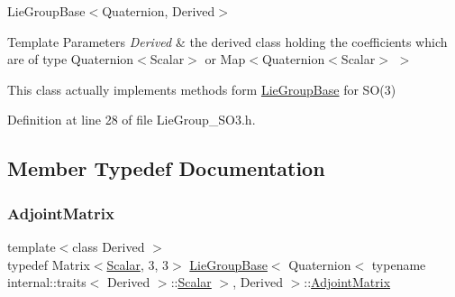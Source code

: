 Lie\+Group\+Base$<$\+Quaternion, Derived$>$


\begin{DoxyTemplParams}{Template Parameters}
{\em Derived} & the derived class holding the coefficients which are of type Quaternion$<$\+Scalar$>$ or Map$<$Quaternion$<$\+Scalar$>$ $>$\\
\hline
\end{DoxyTemplParams}
This class actually implements methods form \hyperlink{class_lie_group_base}{Lie\+Group\+Base} for S\+O(3) 

Definition at line 28 of file Lie\+Group\+\_\+\+S\+O3.\+h.



\subsection{Member Typedef Documentation}
\hypertarget{class_lie_group_base_3_01_quaternion_3_01typename_01internal_1_1traits_3_01_derived_01_4_1_1_scalar_01_4_00_01_derived_01_4_a78de97b1de2faa5ee198be16e6b61931}{}\label{class_lie_group_base_3_01_quaternion_3_01typename_01internal_1_1traits_3_01_derived_01_4_1_1_scalar_01_4_00_01_derived_01_4_a78de97b1de2faa5ee198be16e6b61931} 
\subsubsection{\texorpdfstring{Adjoint\+Matrix}{AdjointMatrix}}
{\footnotesize\ttfamily template$<$class Derived $>$ \\
typedef Matrix$<$\hyperlink{class_lie_group_base_3_01_quaternion_3_01typename_01internal_1_1traits_3_01_derived_01_4_1_1_scalar_01_4_00_01_derived_01_4_afadeceb3b98e52deecc572e71efb82a8}{Scalar}, 3, 3$>$ \hyperlink{class_lie_group_base}{Lie\+Group\+Base}$<$ Quaternion$<$ typename internal\+::traits$<$ Derived $>$\+::\hyperlink{class_lie_group_base_3_01_quaternion_3_01typename_01internal_1_1traits_3_01_derived_01_4_1_1_scalar_01_4_00_01_derived_01_4_afadeceb3b98e52deecc572e71efb82a8}{Scalar} $>$, Derived $>$\+::\hyperlink{class_lie_group_base_3_01_quaternion_3_01typename_01internal_1_1traits_3_01_derived_01_4_1_1_scalar_01_4_00_01_derived_01_4_a78de97b1de2faa5ee198be16e6b61931}{Adjoint\+Matrix}}

